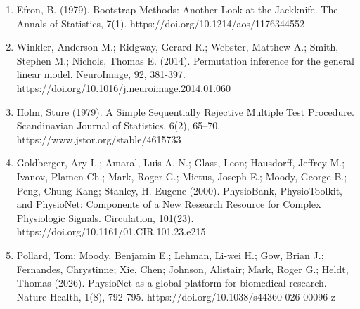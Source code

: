 \documentclass[11pt]{article}
\begin{document}
\begin{enumerate}
\item Efron, B. (1979). Bootstrap Methods: Another Look at the Jackknife. The Annals of Statistics, 7(1). https://doi.org/10.1214/aos/1176344552
\item Winkler, Anderson M.; Ridgway, Gerard R.; Webster, Matthew A.; Smith, Stephen M.; Nichols, Thomas E. (2014). Permutation inference for the general linear model. NeuroImage, 92, 381-397. https://doi.org/10.1016/j.neuroimage.2014.01.060
\item Holm, Sture (1979). A Simple Sequentially Rejective Multiple Test Procedure. Scandinavian Journal of Statistics, 6(2), 65--70. https://www.jstor.org/stable/4615733
\item Goldberger, Ary L.; Amaral, Luis A. N.; Glass, Leon; Hausdorff, Jeffrey M.; Ivanov, Plamen Ch.; Mark, Roger G.; Mietus, Joseph E.; Moody, George B.; Peng, Chung-Kang; Stanley, H. Eugene (2000). PhysioBank, PhysioToolkit, and PhysioNet: Components of a New Research Resource for Complex Physiologic Signals. Circulation, 101(23). https://doi.org/10.1161/01.CIR.101.23.e215
\item Pollard, Tom; Moody, Benjamin E.; Lehman, Li-wei H.; Gow, Brian J.; Fernandes, Chrystinne; Xie, Chen; Johnson, Alistair; Mark, Roger G.; Heldt, Thomas (2026). PhysioNet as a global platform for biomedical research. Nature Health, 1(8), 792-795. https://doi.org/10.1038/s44360-026-00096-z
\end{enumerate}
\end{document}
